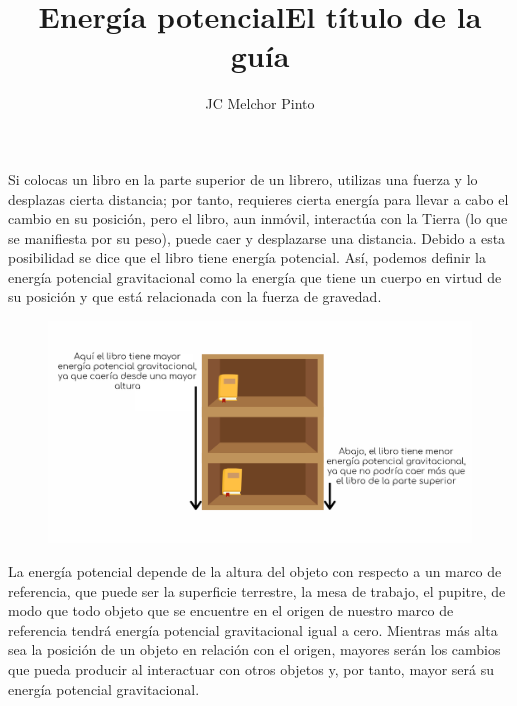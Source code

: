\documentclass[12pt,addpoints,answers]{guia}
\title{Energía potencial}
\title{El título de la guía}
\author{JC Melchor Pinto}
\begin{document}
\pagestyle{headandfoot}

\INFO
\begin{opening}{
        \begin{minipage}{0.45\textwidth}
            Si colocas un libro en la parte superior de un librero, utilizas una fuerza y lo
            desplazas cierta distancia; por tanto, requieres cierta energía para llevar a cabo el
            cambio en su posición, pero el libro, aun inmóvil, interactúa con la Tierra (lo que se
            manifiesta por su peso), puede caer y desplazarse una distancia. Debido a esta
            posibilidad se dice que el libro tiene energía potencial. Así, podemos definir la energía
            potencial gravitacional como la energía que tiene un cuerpo en virtud de su posición
            y que está relacionada con la fuerza de gravedad.
        \end{minipage}\hfill
        \begin{minipage}{0.55\textwidth}
            \begin{figure}[H]
                \centering
                \includegraphics[width=\linewidth]{../images/Gravitational-potential-energy.png}
            \end{figure}%
        \end{minipage}

        La energía potencial depende de la altura del objeto con respecto a un marco de
        referencia, que puede ser la superficie terrestre, la mesa de trabajo, el pupitre,
        de modo que todo objeto que se encuentre en el origen de nuestro marco de referencia tendrá energía potencial gravitacional igual a cero. Mientras más alta sea la posición de un objeto en relación con el origen, mayores serán los cambios que pueda
        producir al interactuar con otros objetos y, por tanto, mayor será su energía potencial
        gravitacional.\\

}
\end{opening}
\end{document}
